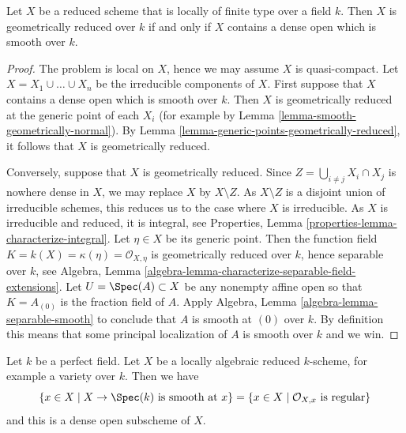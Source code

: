 \begin{lemma}
\label{lemma-geometrically-reduced-dense-smooth-open}
Let $X$ be a reduced scheme that is locally of finite type over a field $k$.
Then $X$ is geometrically reduced over $k$ if and only if
$X$ contains a dense open which is smooth over $k$.
\end{lemma}

\begin{proof}
The problem is local on $X$, hence we may assume $X$ is quasi-compact.
Let $X = X_1 \cup \ldots \cup X_n$ be the irreducible components of $X$.
First suppose that $X$ contains a dense open which is smooth over $k$.
Then $X$ is geometrically reduced at the generic point of each $X_i$
(for example by Lemma \ref{lemma-smooth-geometrically-normal}).
By Lemma \ref{lemma-generic-points-geometrically-reduced},
it follows that $X$ is geometrically reduced.

\medskip\noindent
Conversely, suppose that $X$ is geometrically reduced.
Since $Z = \bigcup_{i \not = j} X_i \cap X_j$ is nowhere dense in $X$,
we may replace $X$ by $X \setminus Z$. As $X \setminus Z$ is a
disjoint union of irreducible schemes, this reduces us to the case
where $X$ is irreducible. As $X$ is irreducible and reduced, it is
integral, see
Properties, Lemma \ref{properties-lemma-characterize-integral}.
Let $\eta \in X$ be its generic point.
Then the function field $K = k(X) = \kappa(\eta) = \mathcal{O}_{X, \eta}$
is geometrically reduced over $k$, hence separable over $k$, see
Algebra, Lemma \ref{algebra-lemma-characterize-separable-field-extensions}.
Let $U = \Spec(A) \subset X$ be any nonempty affine open
so that $K = A_{(0)}$ is the fraction field of $A$. Apply
Algebra, Lemma \ref{algebra-lemma-separable-smooth}
to conclude that $A$ is smooth at $(0)$ over $k$.
By definition this means that some principal localization
of $A$ is smooth over $k$ and we win.
\end{proof}

\begin{lemma}
\label{lemma-dense-smooth-open-variety-over-perfect-field}
Let $k$ be a perfect field. Let $X$ be a locally algebraic
reduced $k$-scheme, for example a variety over $k$. Then we have
$$
\{x \in X \mid X \to \Spec(k)\text{ is smooth at }x\} =
\{x \in X \mid \mathcal{O}_{X, x}\text{ is regular}\}
$$
and this is a dense open subscheme of $X$.
\end{lemma}

